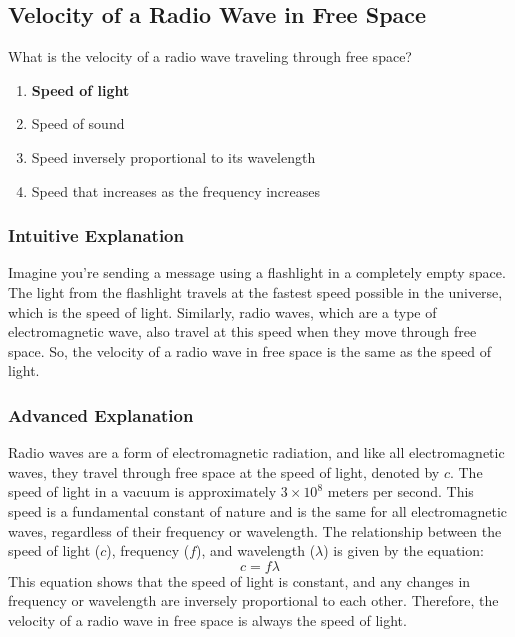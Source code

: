 \subsection{Velocity of a Radio Wave in Free Space}
\label{T3B04}

\begin{tcolorbox}[colback=gray!10!white,colframe=black!75!black,title=T3B04]
What is the velocity of a radio wave traveling through free space?
\begin{enumerate}[noitemsep]
    \item \textbf{Speed of light}
    \item Speed of sound
    \item Speed inversely proportional to its wavelength
    \item Speed that increases as the frequency increases
\end{enumerate}
\end{tcolorbox}

\subsubsection*{Intuitive Explanation}
Imagine you're sending a message using a flashlight in a completely empty space. The light from the flashlight travels at the fastest speed possible in the universe, which is the speed of light. Similarly, radio waves, which are a type of electromagnetic wave, also travel at this speed when they move through free space. So, the velocity of a radio wave in free space is the same as the speed of light.

\subsubsection*{Advanced Explanation}
Radio waves are a form of electromagnetic radiation, and like all electromagnetic waves, they travel through free space at the speed of light, denoted by \( c \). The speed of light in a vacuum is approximately \( 3 \times 10^8 \) meters per second. This speed is a fundamental constant of nature and is the same for all electromagnetic waves, regardless of their frequency or wavelength. The relationship between the speed of light (\( c \)), frequency (\( f \)), and wavelength (\( \lambda \)) is given by the equation:
\[
c = f \lambda
\]
This equation shows that the speed of light is constant, and any changes in frequency or wavelength are inversely proportional to each other. Therefore, the velocity of a radio wave in free space is always the speed of light.